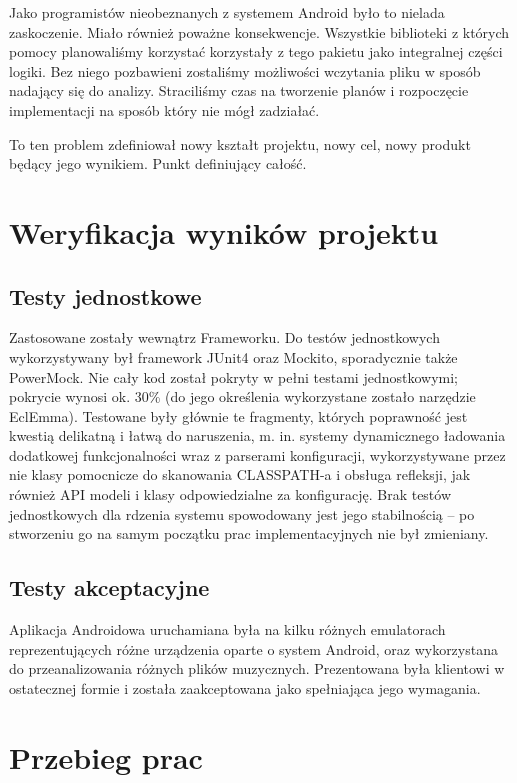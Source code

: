 Jako programistów nieobeznanych z systemem Android było to nielada zaskoczenie. Miało również poważne konsekwencje. Wszystkie biblioteki z których pomocy planowaliśmy korzystać korzystały z tego pakietu jako integralnej części logiki. Bez niego pozbawieni zostaliśmy możliwości wczytania pliku w sposób nadający się do analizy. Straciliśmy czas na tworzenie planów i rozpoczęcie implementacji na sposób który nie mógł zadziałać.

To ten problem zdefiniował nowy kształt projektu, nowy cel, nowy produkt będący jego wynikiem. Punkt definiujący całość.

\chapter{Weryfikacja wyników projektu}

\section{Testy jednostkowe}
Zastosowane zostały wewnątrz Frameworku. Do testów jednostkowych wykorzystywany był framework JUnit4 oraz Mockito, sporadycznie także
PowerMock. Nie cały kod został pokryty w pełni testami jednostkowymi; pokrycie wynosi ok. 30\% (do
jego określenia wykorzystane zostało narzędzie EclEmma). Testowane były głównie te fragmenty,
których poprawność jest kwestią delikatną i łatwą do naruszenia, m. in. systemy dynamicznego
ładowania dodatkowej funkcjonalności wraz z parserami konfiguracji, wykorzystywane przez nie klasy
pomocnicze do skanowania CLASSPATH-a i obsługa refleksji, jak również API modeli i klasy
odpowiedzialne za konfigurację. Brak testów jednostkowych dla rdzenia systemu spowodowany jest jego
stabilnością -- po stworzeniu go na samym początku prac implementacyjnych nie był zmieniany.

\section{Testy akceptacyjne}
Aplikacja Androidowa uruchamiana była na kilku różnych emulatorach reprezentujących różne urządzenia oparte o system Android, oraz wykorzystana do przeanalizowania różnych plików muzycznych. Prezentowana była klientowi w ostatecznej formie i została zaakceptowana jako spełniająca jego wymagania.

\chapter{Przebieg prac}


